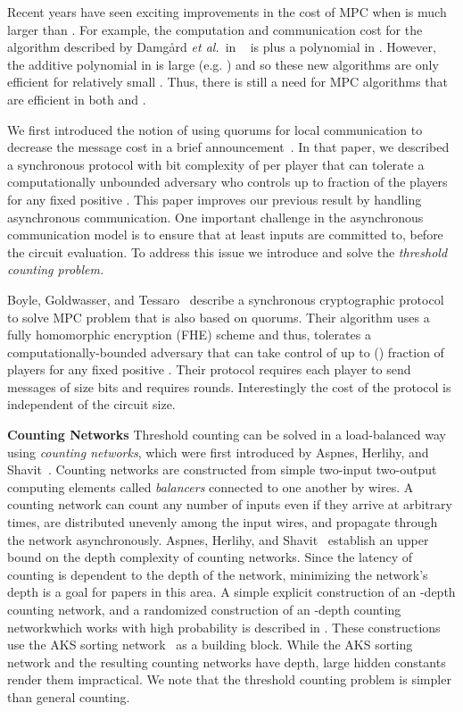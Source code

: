 \documentclass[10pt]{llncs}
\newcommand{\etal}{\emph{et al.\,}}
\begin{document}
Recent years have seen exciting improvements in the cost of MPC when
 is much larger than 
\cite{damgard2006scalable,damgard2007scalable,damgard2008scalable}. 
For example, the computation and communication cost for the algorithm described by Damg{\aa}rd \etal
in
~\cite{damgard2008scalable} is  plus a polynomial in
. However, the additive polynomial in  is large
(e.g. ) and so these new algorithms are only efficient
for relatively small . Thus, there is still a need for MPC
algorithms that are efficient in both  and .

We first introduced the notion of using quorums for local
communication to decrease the message cost in a brief
announcement~\cite{Dani12}. In that paper, we described a synchronous
protocol with bit complexity of 
per player that can tolerate a computationally unbounded adversary who
controls up to  fraction of the players for any
fixed positive . This paper improves our previous result by
handling asynchronous communication. One important challenge in 
the asynchronous communication model is to ensure that at least 
 inputs are committed to, before the circuit evaluation. 
To address this issue we introduce and solve the \emph{threshold counting 
problem.}

Boyle, Goldwasser, and Tessaro~\cite{Boyle13} describe a synchronous
cryptographic protocol to solve MPC problem that is also based on
quorums. Their algorithm uses a fully homomorphic encryption (FHE)
scheme and thus, tolerates a computationally-bounded adversary that
can take control of up to () fraction of players for
any fixed positive . Their protocol requires each player to
send  messages of size  bits and
requires  rounds. Interestingly
the cost of the protocol is independent of the circuit size.

\smallskip
\noindent
{\bf Counting Networks} 
Threshold counting can be solved in a 
load-balanced way using
\emph{counting networks}, which were first introduced
by Aspnes, Herlihy, and Shavit~\cite{Aspnes:1991:CNM:103418.103421}.
Counting networks are
constructed from simple two-input two-output computing elements called
\emph{balancers} connected to one another by wires. A counting network
can count any number of inputs even if they arrive at arbitrary times,
are distributed unevenly among the input wires, and propagate through
the network asynchronously. Aspnes, Herlihy, and 
Shavit~\cite{Aspnes:1991:CNM:103418.103421} establish an 
upper bound on the depth complexity of counting networks.  Since the
latency of counting is dependent to the depth of the network,
minimizing the network's depth is a goal for papers in this area. A
simple explicit construction of an -depth
counting network, and a randomized construction of an -depth counting networkwhich works with high probability is described in
\cite{Klugerman:1992:SCN:129712.129752,Klugerman94small-depthcounting}. 
These constructions use the AKS sorting
network~\cite{Ajtai:1983:SN:800061.808726} as a building block.
While the AKS sorting network and the resulting counting networks
have  depth, large hidden constants render them impractical.
We note that the threshold counting problem is simpler than general 
counting.
\end{document}
